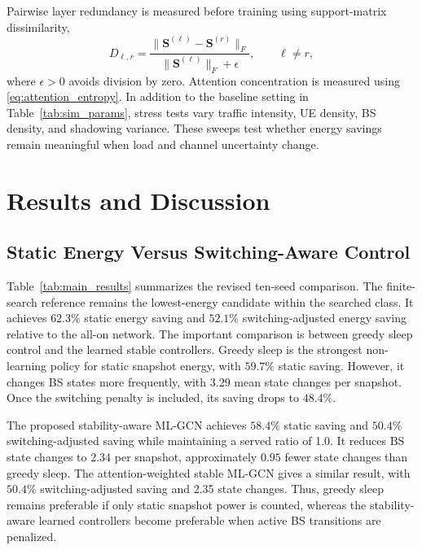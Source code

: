 \documentclass[journal]{IEEEtran}
\begin{document}
Pairwise layer redundancy is measured before training using support-matrix
dissimilarity,
\begin{equation}
    D_{\ell,r}
    =
    \frac{\|\mathbf{S}^{(\ell)}-\mathbf{S}^{(r)}\|_F}
    {\|\mathbf{S}^{(\ell)}\|_F+\epsilon},
    \qquad \ell\neq r,
    \label{eq:layer_dissimilarity}
\end{equation}
where $\epsilon>0$ avoids division by zero. Attention concentration is measured
using \eqref{eq:attention_entropy}. In addition to the baseline setting in
Table~\ref{tab:sim_params}, stress tests vary traffic intensity, UE density,
BS density, and shadowing variance. These sweeps test whether energy savings
remain meaningful when load and channel uncertainty change.

\section{Results and Discussion}
\subsection{Static Energy Versus Switching-Aware Control}
Table~\ref{tab:main_results} summarizes the revised ten-seed comparison. The
finite-search reference remains the lowest-energy candidate within the searched
class. It achieves $62.3\%$ static energy saving and $52.1\%$
switching-adjusted energy saving relative to the all-on network. The important
comparison is between greedy sleep control and the learned stable controllers.
Greedy sleep is the strongest non-learning policy for static snapshot energy,
with $59.7\%$ static saving. However, it changes BS states more frequently,
with 3.29 mean state changes per snapshot. Once the switching penalty is
included, its saving drops to $48.4\%$.

The proposed stability-aware ML-GCN achieves $58.4\%$ static saving and
$50.4\%$ switching-adjusted saving while maintaining a served ratio of 1.0.
It reduces BS state changes to 2.34 per snapshot, approximately $0.95$ fewer
state changes than greedy sleep. The attention-weighted stable ML-GCN gives a
similar result, with $50.4\%$ switching-adjusted saving and 2.35 state changes.
Thus, greedy sleep remains preferable if only static snapshot power is counted,
whereas the stability-aware learned controllers become preferable when active
BS transitions are penalized.
\end{document}
